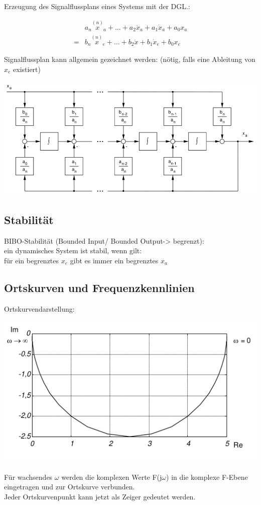 \documentclass[10pt,a4paper]{article}
\begin{document}
Erzeugung des Signalflussplans eines Systems mit der DGL.:

\begin{align*}
	  & a_{n} \overset{(n)}{x}_{a}+\ldots+a_{2} \ddot{x}_{a}+a_{1} \dot{x}_{a}+a_{0} x_{a} \\
	= & b_{n} \overset{(n)}{x}_{e}+\ldots+b_{2} \ddot{x}+b_{1} \dot{x}_{e}+b_{0} x_{e}
\end{align*}

Signalflussplan kann allgemein gezeichnet werden: (nötig, falls eine Ableitung von $x_e$ existiert)

\includegraphics[width=0.9\columnwidth]{Figures/SFmitDGL.png}

\subsection{Stabilität}
\begin{mdframed}[style=exercise]
	BIBO-Stabilität (Bounded Input/ Bounded Output-> begrenzt):\\
	ein dynamisches System ist stabil, wenn gilt:\\
	für ein begrenztes $x_e$ gibt es immer ein begrenztes $x_a$
\end{mdframed}

\subsection{Ortskurven und Frequenzkennlinien}

Ortskurvendarstellung:
\begin{center}
	\includegraphics[width=0.96\columnwidth]{Figures/Ortskurve.png}
\end{center}
\begin{mdframed}[style=exercise]
	Für wachsendes $\omega$ werden die komplexen Werte F(j$\omega$) in die
	komplexe F-Ebene eingetragen und zur Ortskurve verbunden.\\ Jeder
	Ortskurvenpunkt kann jetzt als Zeiger gedeutet werden.
\end{mdframed}
\end{document}
